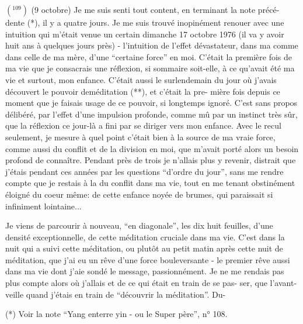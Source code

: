 \(({}^{109})\) (9 octobre) Je me suis senti tout content, en terminant la note précé-\linebreak
dente (*), il y a quatre jours. Je me suis trouvé inopinément renouer avec une
intuition qui m'était venue un certain dimanche 17 octobre 1976 (il va y avoir
huit ans à quelques jours près) - l'intuition de l'effet dévastateur, dans ma 
comme dans celle de ma mère, d'une ``certaine force'' en moi. C'était la première
fois de ma vie que je consacrais une réflexion, si sommaire soit-elle, à ce
qu'avait été ma vie et surtout, mon enfance. C'était aussi le surlendemain du
jour où j'avais découvert le pouvoir de\quad méditation (**), et c'était la pre-\linebreak
mière fois depuis ce moment que je faisais usage de ce pouvoir, si longtemps
ignoré. C'est sans propos délibéré, par l'effet d'une impulsion profonde, comme
mû par un instinct très sûr, que la réflexion ce jour-là a fini par se diriger
vers mon enfance. Avec le recul seulement, je mesure à quel point c'était bien
à la source de ma vraie force, comme aussi du conflit et de la division en moi,
que m'avait porté alors un besoin profond de connaître. Pendant près de trois 
je n'allais plus y revenir, distrait que j'étais pendant ces années par les 
questions ``d'ordre du jour'', sans me rendre compte que je restais à la 
du conflit dans ma vie, tout en me tenant obstinément éloigné du coeur même: de
cette enfance noyée de brumes, qui paraissait si infiniment lointaine...

Je viens de parcourir à nouveau, ``en diagonale'', les dix huit feuilles,
d'une densité exceptionnelle, de cette méditation cruciale dans ma vie. C'est
dans la nuit qui a suivi cette méditation, ou plutôt au petit matin après cette
nuit de méditation, que j'ai eu un rêve d'une force bouleversante - le premier
rêve aussi dans ma vie dont j'aie sondé le message, passionnément. Je ne me
rendais pas plus compte alors où j'allais et de ce qui était en train de se pas-\linebreak
ser, que l'avant-veille quand j'étais en train de ``découvrir la méditation''. Du-

(*) Voir la note ``Yang enterre yin - ou le Super père'', n° 108.

